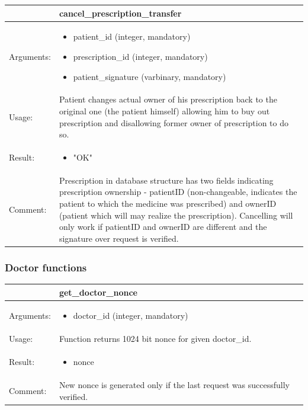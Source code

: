 \begin{table}[h]
    \begin{tabular}{| p{6cm} | p{7.75cm} |}
    \hline
     & cancel\_prescription\_transfer \\ \hline
    Arguments: &  \begin{itemize}
    	\item patient\_id (integer, mandatory)
		\item prescription\_id (integer, mandatory)
		\item patient\_signature (varbinary, mandatory)
	\end{itemize}     \\ \hline
    Usage: & Patient changes actual owner of his prescription back to the original one (the patient himself) allowing him to buy out prescription and disallowing former owner of prescription to do so. \\ \hline
    Result: & \begin{itemize}
    	\item "OK"
	\end{itemize}     \\ \hline	
		Comment: & Prescription in database structure has two fields indicating prescription ownership - patientID (non-changeable, indicates the patient to which the medicine was prescribed) and ownerID (patient which will may realize the prescription). Cancelling will only work if patientID and ownerID are different and the signature over request is verified. \\ \hline
    \end{tabular}
\end{table}

\subsubsection{Doctor functions}

\begin{table}[h]
    \begin{tabular}{| p{6cm} | p{7.75cm} |}
    \hline
     & get\_doctor\_nonce \\ \hline
    Arguments: &  \begin{itemize}
    	\item doctor\_id (integer, mandatory)
	\end{itemize}     \\ \hline
    Usage: & Function returns 1024 bit nonce for given doctor\_id. \\ \hline
    Result: & \begin{itemize}
    	\item nonce
	\end{itemize}     \\ \hline	
			Comment: & New nonce is generated only if the last request was successfully verified.\\ \hline
    \end{tabular}
\end{table}

